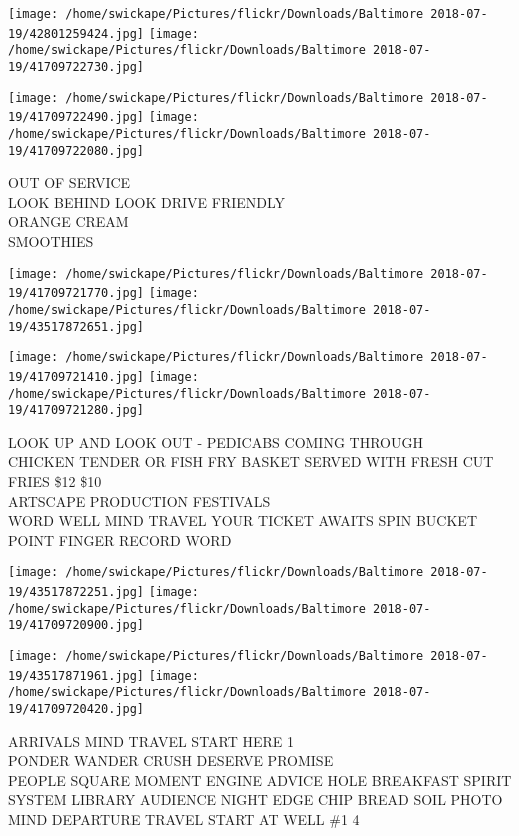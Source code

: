 \documentclass[10pt,letterpaper]{article}
\begin{document}
\texttt{[image: /home/swickape/Pictures/flickr/Downloads/Baltimore 2018-07-19/42801259424.jpg]}
\texttt{[image: /home/swickape/Pictures/flickr/Downloads/Baltimore 2018-07-19/41709722730.jpg]}

\texttt{[image: /home/swickape/Pictures/flickr/Downloads/Baltimore 2018-07-19/41709722490.jpg]}
\texttt{[image: /home/swickape/Pictures/flickr/Downloads/Baltimore 2018-07-19/41709722080.jpg]}

OUT OF SERVICE\\
LOOK BEHIND LOOK DRIVE FRIENDLY\\
ORANGE CREAM\\
SMOOTHIES\\
\pagebreak

\texttt{[image: /home/swickape/Pictures/flickr/Downloads/Baltimore 2018-07-19/41709721770.jpg]}
\texttt{[image: /home/swickape/Pictures/flickr/Downloads/Baltimore 2018-07-19/43517872651.jpg]}

\texttt{[image: /home/swickape/Pictures/flickr/Downloads/Baltimore 2018-07-19/41709721410.jpg]}
\texttt{[image: /home/swickape/Pictures/flickr/Downloads/Baltimore 2018-07-19/41709721280.jpg]}

LOOK UP AND LOOK OUT {-} PEDICABS COMING THROUGH\\
CHICKEN TENDER OR FISH FRY BASKET SERVED WITH FRESH CUT FRIES \$12 \$10\\
ARTSCAPE PRODUCTION FESTIVALS\\
WORD WELL MIND TRAVEL YOUR TICKET AWAITS SPIN BUCKET POINT FINGER RECORD WORD\\
\pagebreak

\texttt{[image: /home/swickape/Pictures/flickr/Downloads/Baltimore 2018-07-19/43517872251.jpg]}
\texttt{[image: /home/swickape/Pictures/flickr/Downloads/Baltimore 2018-07-19/41709720900.jpg]}

\texttt{[image: /home/swickape/Pictures/flickr/Downloads/Baltimore 2018-07-19/43517871961.jpg]}
\texttt{[image: /home/swickape/Pictures/flickr/Downloads/Baltimore 2018-07-19/41709720420.jpg]}

ARRIVALS MIND TRAVEL START HERE 1\\
PONDER WANDER CRUSH DESERVE PROMISE\\
PEOPLE SQUARE MOMENT ENGINE ADVICE HOLE BREAKFAST SPIRIT SYSTEM LIBRARY AUDIENCE NIGHT EDGE CHIP BREAD SOIL PHOTO\\
MIND DEPARTURE TRAVEL START AT WELL \#1 4\\
\pagebreak
\end{document}
